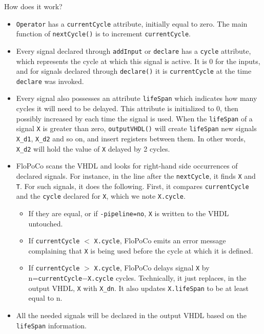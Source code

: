 \documentclass{article}
\begin{document}
How does it work? 
\begin{itemize}\item 
  \verb!Operator! has a \verb!currentCycle! attribute, initially equal to
  zero. The main function of 	\verb!nextCycle()! is to increment \verb!currentCycle!.

\item Every signal declared through \verb!addInput! or \verb!declare!
  has a \verb!cycle! attribute, which represents the cycle at which
  this signal is active. It is 0 for the inputs, and for signals
  declared through \verb!declare()! it is \verb!currentCycle!  at the
  time \verb!declare! was invoked.

\item Every signal also possesses an attribute \verb!lifeSpan! which
  indicates how many cycles it will need to be delayed. This attribute
  is initialized to 0, then possibly increased by each time the signal is used.
  When the \verb!lifeSpan! of a signal \verb!X!  is
  greater than zero, \verb!outputVHDL()! will create \verb!lifeSpan!
  new signals \verb!X_d1!, \verb!X_d2! and so on, and insert registers
  between them. In other words, \verb!X_d2! will hold the value of
  \verb!X! delayed by 2 cycles.

\item FloPoCo scans the VHDL and looks for right-hand side occurrences
  of declared signals. For instance, in the line after the
  \verb!nextCycle!, it finds \verb!X! and \verb!T!. For such signals, it does the following. First,
  it compares \verb!currentCycle! and the
  \verb!cycle! declared for \verb!X!, which we note \verb!X.cycle!.
  \begin{itemize}\item 
    If they are equal, or if \verb!-pipeline=no!, \verb!X! is written to the VHDL untouched.
  \item If \verb!currentCycle! $<$ \verb!X.cycle!, FloPoCo emits an error message complaining that \verb!X! is being
    used before the cycle at which it is defined.
  \item If \verb!currentCycle! $>$ \verb!X.cycle!, FloPoCo delays
    signal \verb!X! by n=\verb!currentCycle!$-$\verb!X.cycle!
    cycles. Technically, it just replaces, in the output VHDL,
    \verb!X! with \verb!X_dn!. It also updates \verb!X.lifeSpan! to be
    at least equal to n.
  \end{itemize}
\item All the needed signals will be declared in the output VHDL based
  on the \verb!lifeSpan! information.
\end{itemize}
\end{document}
